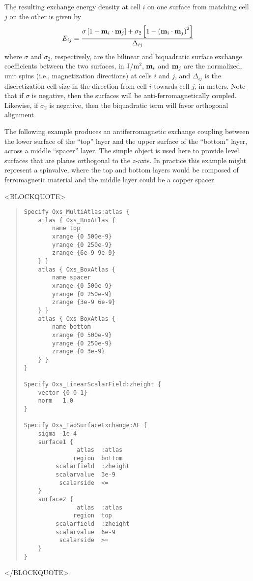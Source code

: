 \begin{description}
   The resulting exchange energy density at cell $i$ on one surface
   from matching cell $j$ on the other is given by
   \begin{displaymath}
        E_{ij} =  \frac{\sigma\left[1-\textbf{m}_i\cdot\textbf{m}_j\right]
         +\sigma_2\left[1-\left(\textbf{m}_i\cdot\textbf{m}_j\right)^2\right]
        }{\Delta_{ij}}
   \end{displaymath}
   where $\sigma$ and $\sigma_2$, respectively, are the bilinear and
   biquadratic surface exchange coefficients between the two surfaces,
   in J/m${}^2$, $\textbf{m}_i$ and $\textbf{m}_j$ are the normalized, unit spins
   (i.e., magnetization directions) at cells $i$ and $j$, and
   $\Delta_{ij}$ is the discretization cell size in the direction from
   cell $i$ towards cell $j$, in meters.  Note that if $\sigma$ is
   negative, then the surfaces will be anti-ferromagnetically coupled.
   Likewise, if $\sigma_2$ is negative, then the biquadratic term will
   favor orthogonal alignment.

   The following example produces an antiferromagnetic exchange coupling
   between the lower surface of the ``top'' layer and the upper surface
   of the ``bottom'' layer, across a middle ``spacer'' layer.  The
   simple  object is used here to provide
   level surfaces that are planes orthogonal to the $z$-axis.  In
   practice this example might represent a spinvalve, where the top and
   bottom layers would be composed of ferromagnetic material and the
   middle layer could be a copper spacer.
\begin{rawhtml}
<BLOCKQUOTE>
\end{rawhtml}
\begin{quote}
\begin{verbatim}
Specify Oxs_MultiAtlas:atlas {
    atlas { Oxs_BoxAtlas {
        name top
        xrange {0 500e-9}
        yrange {0 250e-9}
        zrange {6e-9 9e-9}
    } }
    atlas { Oxs_BoxAtlas {
        name spacer
        xrange {0 500e-9}
        yrange {0 250e-9}
        zrange {3e-9 6e-9}
    } }
    atlas { Oxs_BoxAtlas {
        name bottom
        xrange {0 500e-9}
        yrange {0 250e-9}
        zrange {0 3e-9}
    } }
}

Specify Oxs_LinearScalarField:zheight {
    vector {0 0 1}
    norm   1.0
}

Specify Oxs_TwoSurfaceExchange:AF {
    sigma -1e-4
    surface1 {
               atlas  :atlas
              region  bottom
         scalarfield  :zheight
         scalarvalue  3e-9
          scalarside  <=
    }
    surface2 {
               atlas  :atlas
              region  top
         scalarfield  :zheight
         scalarvalue  6e-9
          scalarside  >=
    }
}
\end{verbatim}
\end{quote}
\begin{rawhtml}
</BLOCKQUOTE>
\end{rawhtml}


\end{description}
